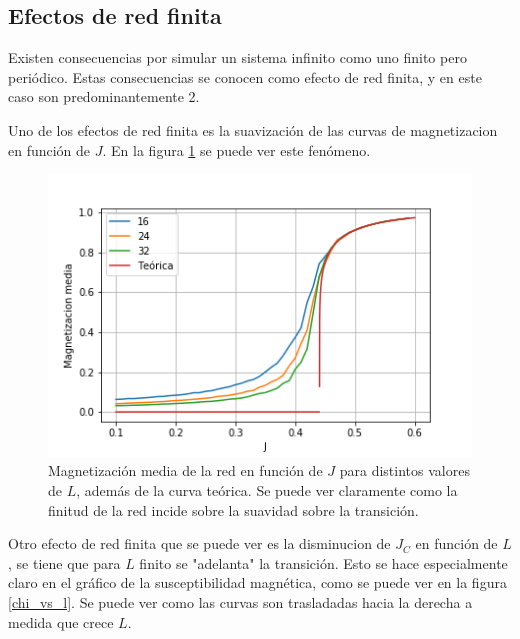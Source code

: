 \documentclass[
 reprint,
 amsmath,amssymb,
 aps,
]{revtex4-1}
\begin{document}
\subsection{Efectos de red finita}

Existen consecuencias por simular un sistema infinito como uno finito pero
peri\'odico. Estas consecuencias se conocen como efecto de red finita, y en
este caso son predominantemente 2.

Uno de los efectos de red finita es la suavizaci\'on de las curvas de
magnetizacion en funci\'on de $J$. En la figura \ref{magnetization_vs_l} se
puede ver este fen\'omeno.

\begin{figure}
  \includegraphics[width=1.0\columnwidth]{images/magnetization_vs_l.png}
  \caption{Magnetizaci\'on media de la red en funci\'on de $J$ para distintos
  valores de $L$, adem\'as de la curva te\'orica. Se puede ver claramente como
  la finitud de la red incide sobre la suavidad sobre la transici\'on.}
  \label{magnetization_vs_l}
\end{figure}

Otro efecto de red finita que se puede ver es la disminucion de $J_C$ en
funci\'on de $L$, se tiene que para $L$ finito se "adelanta" la transici\'on.
Esto se hace especialmente claro en el gr\'afico de la susceptibilidad
magn\'etica, como se puede ver en la figura \ref{chi_vs_l}. Se puede ver como
las curvas son trasladadas hacia la derecha a medida que crece $L$.
\end{document}
